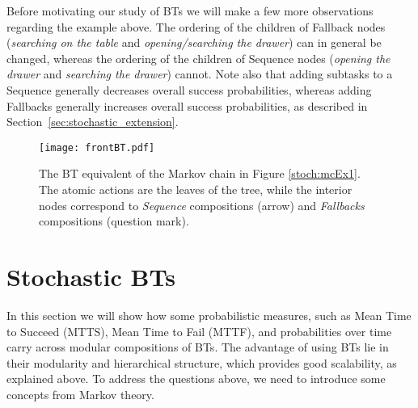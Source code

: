 

Before motivating our study of BTs we will make a few more observations regarding the example above.
The ordering of the children of Fallback nodes (\emph{searching on the table} and \emph{opening/searching the drawer}) can in general be changed, whereas the ordering of the children of 
Sequence nodes (\emph{opening  the drawer} and \emph{searching  the drawer}) cannot.
Note also that adding subtasks to a Sequence generally decreases overall success probabilities, whereas adding Fallbacks generally increases overall success probabilities, as described in Section~\ref{sec:stochastic_extension}.


\begin{figure}[b]
\centering
\texttt{[image: frontBT.pdf]}
\caption{The BT equivalent of the Markov chain in Figure \ref{stoch:mcEx1}. The atomic actions are the leaves of the tree, while the  interior nodes correspond to \emph{Sequence} compositions (arrow) and \emph{Fallbacks} compositions (question mark).
}
\label{stoch:btEx1}
\end{figure}



\section{Stochastic BTs}
\label{stoch:sec:analysis}

In this section we will show how some probabilistic measures, such as  Mean Time to Succeed (MTTS),  Mean Time to Fail (MTTF), and probabilities over time carry across modular compositions of BTs. The advantage of using BTs lie in their modularity and hierarchical structure, which provides good scalability, as explained above.  
To  address the questions above, we need to introduce some concepts from Markov theory.

